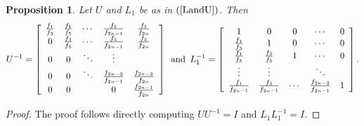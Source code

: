 \documentclass[12pt]{article}
\newtheorem{proposition}[theorem]{Proposition}
\begin{document}
\begin{proposition}
Let $U$ and $L_1$ be as in $(\ref{LandU})$. Then 
\begin{equation*}
U^{-1}= 
\left[ \begin{array}{ccccc}
\frac{f_1}{f_3} & \frac{f_1}{f_5}& \cdots & \frac{f_1}{f_{2n-1}} & \frac{f_1}{f_{2n}}\\
0 & \frac{f_3}{f_5}& \cdots&\frac{f_3}{f_{2n-1}} & \frac{f_3}{f_{2n}}\\
0 & 0 &  \ddots  & \vdots\\
0 & 0 & \ddots   & \frac{f_{2n-3}}{f_{2n-1}} & \frac{f_{2n-3}}{f_{2n}}\\
0 & 0 &  &  0 & \frac{f_{2n-1}}{f_{2n}}\\
\end{array}
\right] \mbox{\, and\, }
L_1^{-1}= 
\left[ \begin{array}{ccccc}
1 & 0&0&  \cdots   & 0\\
\frac{f_1}{f_3} & 1& 0& \cdots    & 0\\
\frac{f_1}{f_5} & \frac{f_3}{f_5}&1 & \cdots & 0\\
\vdots & \vdots & &\ddots   & \\
\frac{f_1}{f_{2n-1}} & \frac{f_{3}}{f_{2n-1}}  &\cdots &   \frac{f_{2n-3}}{f_{2n-1}}& 1\\
\end{array}
\right].
\end{equation*}

\end{proposition}


\begin{proof}
 The proof follows directly computing $UU^{-1}= I$ and $L_{1} L_{1}^{-1}= I$.
\end{proof}
\end{document}
